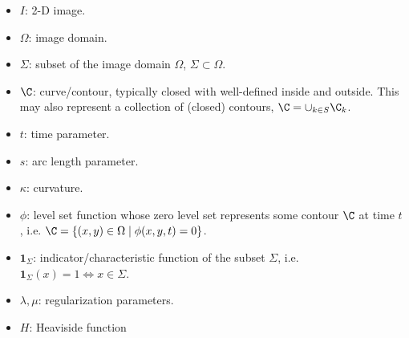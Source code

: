\begin{itemize}
	\item $I$: 2-D image.
	
	\item $\Omega$: image domain.
	
	\item $\Sigma$: subset of the image domain $\Omega$, $\Sigma \subset \Omega$.
	
	\item $\C$: curve/contour, typically closed with well-defined inside and outside. This may also represent a collection of (closed) contours, $\C = \cup_{k \in S} \C_k$.
	
	\item $t$: time parameter. 
	
	\item $s$: arc length parameter.
	
	\item $\kappa$: curvature. 
	
	\item $\phi$: level set function whose zero level set represents some contour $\C$ at time $t$, i.e. $\C = \{(x,y) \in \Omega \mid \phi(x,y,t) = 0\}$. 
	
	\item $\mathbf{1}_\Sigma$: indicator/characteristic function of the subset $\Sigma$, i.e. $\mathbf{1}_\Sigma(x) = 1 \iff x \in \Sigma$.
	
	\item $\lambda, \mu$: regularization parameters.
	
	\item $H$: Heaviside function
\end{itemize}